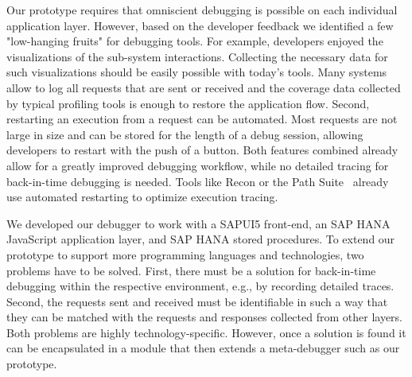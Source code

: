Our prototype requires that omniscient debugging is possible on each individual application layer.
However, based on the developer feedback we identified a few "low-hanging fruits" for debugging tools.
For example, developers enjoyed the visualizations of the sub-system interactions.
Collecting the necessary data for such visualizations should be easily possible with today's tools.
Many systems allow to log all requests that are sent or received and the coverage data collected by typical profiling tools is enough to restore the application flow.
Second, restarting an execution from a request can be automated.
Most requests are not large in size and can be stored for the length of a debug session, allowing developers to restart with the push of a button.
Both features combined already allow for a greatly improved debugging workflow, while no detailed tracing for back-in-time debugging is needed.
Tools like Recon or the Path Suite~\cite{lee11:unified_debugging_of_distributed, perscheid13:test-driven_fault_navigation} already use automated restarting to optimize execution tracing.

We developed our debugger to work with a SAPUI5 front-end, an SAP HANA JavaScript application layer, and SAP HANA stored procedures.
To extend our prototype to support more programming languages and technologies, two problems have to be solved.
First, there must be a solution for back-in-time debugging within the respective environment, e.g., by recording detailed traces.
Second, the requests sent and received must be identifiable in such a way that they can be matched with the requests and responses collected from other layers.
Both problems are highly technology-specific. 
However, once a solution is found it can be encapsulated in a module that then extends a meta-debugger such as our prototype.

